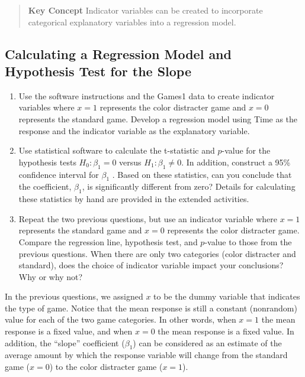 \documentclass[
]{report}
\begin{document}
\begin{quote}
\textbf{Key Concept}
Indicator variables can be created to incorporate categorical explanatory variables into a regression model.
\end{quote}

\subsection*{Calculating a Regression Model and Hypothesis Test for the Slope}\label{calculating-a-regression-model-and-hypothesis-test-for-the-slope}

\begin{enumerate}
\def\labelenumi{\arabic{enumi}.}
\setcounter{enumi}{10}
\item
  Use the software instructions and the Games1 data to create indicator variables where \(x = 1\) represents the color distracter game and \(x = 0\) represents the standard game. Develop a regression model using Time as the response and the indicator variable as the explanatory variable.
\item
  Use statistical software to calculate the t-statistic and \(p\)-value for the hypothesis tests \(H_0 : \beta_1 = 0\) versus \(H_1 : \beta_1 \ne 0\). In addition, construct a 95\% confidence interval for \(\beta_1\) . Based on these statistics, can you conclude that the coefficient, \(\beta_1\), is significantly different from zero? Details for calculating these statistics by hand are provided in the extended activities.
\item
  Repeat the two previous questions, but use an indicator variable where \(x = 1\) represents the standard game and \(x = 0\) represents the color distracter game. Compare the regression line, hypothesis test, and \(p\)-value to those from the previous questions. When there are only two categories (color distracter and standard), does the choice of indicator variable impact your conclusions? Why or why not?
\end{enumerate}

In the previous questions, we assigned \(x\) to be the dummy variable that indicates the type of game. Notice that the mean response is still a constant (nonrandom) value for each of the two game categories. In other
words, when \(x = 1\) the mean response is a fixed value, and when \(x = 0\) the mean response is a fixed value. In addition, the ``slope'' coefficient (\(\beta_1\)) can be considered as an estimate of the average amount by which the response variable will change from the standard game (\(x = 0\)) to the color distracter game (\(x = 1\)).
\end{document}
